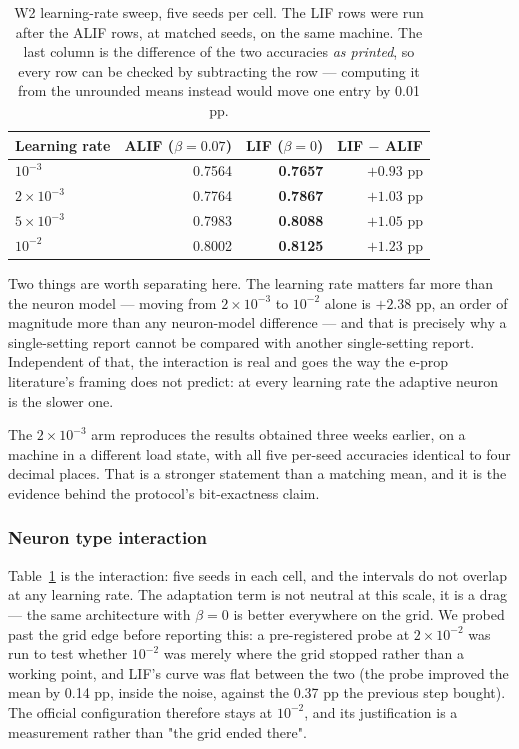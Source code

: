 \documentclass[11pt]{article}
\begin{document}
\begin{table}[h]
\centering
\begin{tabular}{lrrr}
\toprule
Learning rate & ALIF ($\beta=0.07$) & LIF ($\beta=0$) & LIF $-$ ALIF \\
\midrule
$10^{-3}$ & 0.7564 & \textbf{0.7657} & $+0.93$ pp \\
$2\times10^{-3}$ & 0.7764 & \textbf{0.7867} & $+1.03$ pp \\
$5\times10^{-3}$ & 0.7983 & \textbf{0.8088} & $+1.05$ pp \\
$10^{-2}$ & 0.8002 & \textbf{0.8125} & $+1.23$ pp \\
\bottomrule
\end{tabular}
\caption{W2 learning-rate sweep, five seeds per cell. The LIF rows were run
after the ALIF rows, at matched seeds, on the same machine. The last column is
the difference of the two accuracies \emph{as printed}, so every row can be
checked by subtracting the row --- computing it from the unrounded means instead
would move one entry by 0.01 pp.}
\label{tab:w2-lr}
\end{table}

Two things are worth separating here. The learning rate matters far more than
the neuron model --- moving from $2\times10^{-3}$ to $10^{-2}$ alone is
$+2.38$ pp, an order of magnitude more than any neuron-model difference --- and
that is precisely why a single-setting report cannot be compared with another
single-setting report. Independent of that, the interaction is real and goes
the way the e-prop literature's framing does not predict: at every learning rate
the adaptive neuron is the slower one.

The $2\times10^{-3}$ arm reproduces the results obtained three weeks earlier,
on a machine in a different load state, with all five per-seed accuracies
identical to four decimal places. That is a stronger statement than a matching
mean, and it is the evidence behind the protocol's bit-exactness claim.

\subsubsection{Neuron type interaction}
Table~\ref{tab:w2-lr} is the interaction: five seeds in each cell, and the
intervals do not overlap at any learning rate. The adaptation term is not
neutral at this scale, it is a drag --- the same architecture with $\beta=0$ is
better everywhere on the grid. We probed past the grid edge before reporting
this: a pre-registered probe at $2\times10^{-2}$ was run to test whether
$10^{-2}$ was merely where the grid stopped rather than a working point, and
LIF's curve was flat between the two (the probe improved the mean by 0.14 pp,
inside the noise, against the 0.37 pp the previous step bought). The official
configuration therefore stays at $10^{-2}$, and its justification is a
measurement rather than "the grid ended there".
\end{document}
